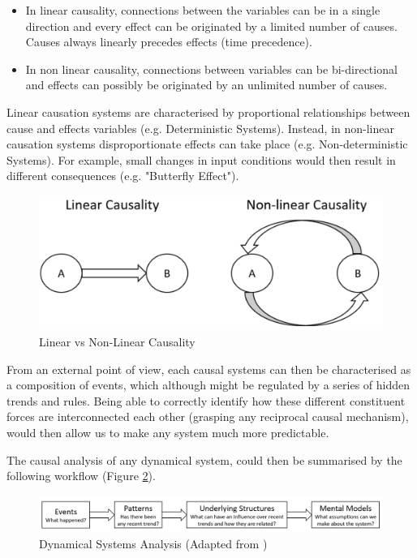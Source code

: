 \vspace{-0.6cm}
\begin{itemize}
    \setlength\itemsep{-0.5em}
    \item In linear causality, connections between the variables can be in a single direction and every effect can be originated by a limited number of causes. Causes always linearly precedes effects (time precedence).
    \item In non linear causality, connections between variables can be bi-directional and effects can possibly be originated by an unlimited number of causes.
\end{itemize}
\vspace{-0.6cm}
Linear causation systems are characterised by proportional relationships between cause and effects variables (e.g. Deterministic Systems). Instead, in non-linear causation systems disproportionate effects can take place (e.g. Non-deterministic Systems). For example, small changes in input conditions would then result in different consequences (e.g. "Butterfly Effect").
\vspace{-0.1cm}
\begin{figure}[ht!]%
    \centering
    \includegraphics[width=0.7\linewidth]{latex/images/linear.pdf}
    \vspace{-0.2cm}
    \caption{Linear vs Non-Linear Causality}
    \label{wow}
\end{figure}
\vspace{-0.5cm}

From an external point of view, each causal systems can then be characterised as a composition of events, which although might be regulated by a series of hidden trends and rules. Being able to correctly identify how these different constituent forces are interconnected each other (grasping any reciprocal causal mechanism), would then allow us to make any system much more predictable. 

The causal analysis of any dynamical system, could then be summarised by the following workflow (Figure \ref{wow2}). 

\begin{figure}[ht!]%
    \centering
    \includegraphics[width=1\linewidth]{latex/images/discover.pdf}
    \vspace{-0.6cm}
    \caption{Dynamical Systems Analysis (Adapted from \cite{system})}
    \label{wow2}
\end{figure}
\vspace{-0.5cm}

